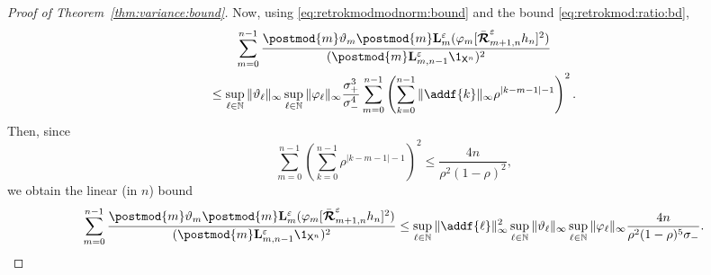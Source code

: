 \begin{proof}[Proof of Theorem~\ref{thm:variance:bound}]
Now, using \eqref{eq:retrokmodmodnorm:bound} and the bound \eqref{eq:retrokmod:ratio:bd}, 
\begin{multline} \label{eq:first:bound:first:term}
\sum_{m = 0}^{n - 1} \frac{\postmod{m} \adjfuncforward{m} \postmod{m} \ukmod{m}(\varphi_m [\retrokmodmodnorm_{m + 1, n} h_n ]^2)}{(\postmod{m} \ukmod{m, n - 1} \1_{\Xset^n})^2} \\ 
\leq \sup_{\ell \in \nset} \| \adjfuncforward{\ell} \|_\infty \sup_{\ell \in \nset} \| \varphi_\ell \|_\infty \frac{\udup^3}{\udlow^4}
\sum_{m = 0}^{n - 1} \left( \sum_{k = 0}^{n - 1} \| \addf{k} \|_\infty \rho^{|k - m - 1| - 1} \right)^2. 
\end{multline}
Then, since 
$$
\sum_{m = 0}^{n - 1} \left( \sum_{k = 0}^{n - 1} \rho^{|k - m - 1| - 1} \right)^2 \leq \frac{4 n}{\rho^2 (1 - \rho)^2}, 
$$
we obtain the linear (in $n$) bound
\begin{equation} \label{eq:linear:bound:first:bound}
\sum_{m = 0}^{n - 1} \frac{\postmod{m} \adjfuncforward{m} \postmod{m} \ukmod{m}(\varphi_m [\retrokmodmodnorm_{m + 1, n} h_n ]^2)}{(\postmod{m} \ukmod{m, n - 1} \1_{\Xset^n})^2} \\ 
\leq 
\sup_{\ell \in \nset} \| \addf{\ell} \|_\infty^2 \sup_{\ell \in \nset} \| \adjfuncforward{\ell} \|_\infty \sup_{\ell \in \nset} \| \varphi_\ell \|_\infty  \frac{4 n}{\rho^2 (1 - \rho)^5 \udlow }. 
\end{equation}


\end{proof}
